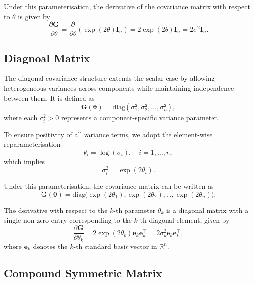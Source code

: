 \documentclass[
  letterpaper,
  DIV=11,
  numbers=noendperiod]{scrartcl}
\begin{document}
Under this parameterisation, the derivative of the covariance matrix
with respect to \(\theta\) is given by \begin{equation}
\frac{\partial \symbf{G}}{\partial \theta}
= \frac{\partial}{\partial \theta}\left(\exp(2\theta)\symbf{I}_n\right)
= 2\exp(2\theta)\symbf{I}_n
= 2\sigma^2 \symbf{I}_n.
\end{equation}

\subsection{Diagnoal Matrix}\label{diagnoal-matrix}

The diagonal covariance structure extends the scalar case by allowing
heterogeneous variances across components while maintaining independence
between them. It is defined as \begin{equation}
\symbf{G}(\symbf{\theta}) = \mathrm{diag}(\sigma_1^2, \sigma_2^2, \ldots, \sigma_n^2),
\end{equation} where each \(\sigma_i^2 > 0\) represents a
component-specific variance parameter.

To ensure positivity of all variance terms, we adopt the element-wise
reparameterisation \begin{equation}
\theta_i = \log(\sigma_i), \quad i = 1, \ldots, n,
\end{equation} which implies \begin{equation}
\sigma_i^2 = \exp(2\theta_i).
\end{equation}

Under this parameterisation, the covariance matrix can be written as
\begin{equation}
\symbf{G}(\symbf{\theta}) = \mathrm{diag}\big(\exp(2\theta_1), \exp(2\theta_2), \ldots, \exp(2\theta_n)\big).
\end{equation}

The derivative with respect to the \(k\)-th parameter \(\theta_k\) is a
diagonal matrix with a single non-zero entry corresponding to the
\(k\)-th diagonal element, given by \begin{equation}
\frac{\partial \symbf{G}}{\partial \theta_k}
= 2\exp(2\theta_k) \mathbf{e}_k \mathbf{e}_k^\top
= 2\sigma_k^2 \mathbf{e}_k \mathbf{e}_k^\top,
\end{equation} where \(\mathbf{e}_k\) denotes the \(k\)-th standard
basis vector in \(\mathbb{R}^n\).

\subsection{Compound Symmetric Matrix}\label{compound-symmetric-matrix}
\end{document}
